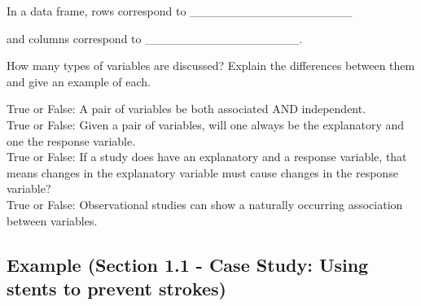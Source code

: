 \documentclass[
]{report}
\newcommand{\rgs}{\vspace{12pt}} %
\begin{document}
In a data frame, rows correspond to \_\_\_\_\_\_\_\_\_\_\_\_\_\_\_\_\_\_\_

and columns correspond to \_\_\_\_\_\_\_\_\_\_\_\_\_\_\_\_\_\_.

How many types of variables are discussed? Explain the differences between them and give an example of each.
\rgs
\rgs
\newpage

True or False: A pair of variables be both associated AND independent.\\
True or False: Given a pair of variables, will one always be the explanatory and one the response variable.\\
True or False: If a study does have an explanatory and a response variable, that means changes in the explanatory variable must cause changes in the response variable?\\
True or False: Observational studies can show a naturally occurring association between variables.

\hypertarget{example-section-1.1---case-study-using-stents-to-prevent-strokes}{%
\subsection*{Example (Section 1.1 - Case Study: Using stents to prevent strokes)}\label{example-section-1.1---case-study-using-stents-to-prevent-strokes}}
\end{document}
